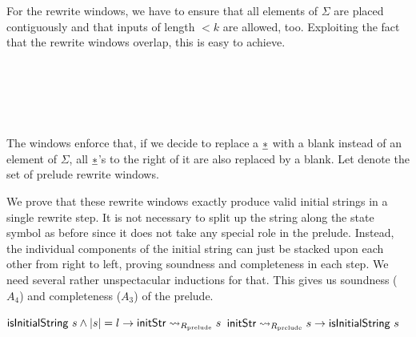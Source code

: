 For the rewrite windows, we have to ensure that all elements of $\Sigma$ are placed contiguously and that inputs of length $< k$ are allowed, too. Exploiting the fact that the rewrite windows overlap, this is easy to achieve.
\begin{center}
  \trewwin{\nblank}{\nblank}{\nblank}{\polneut\blank}{\polneut\blank}{\polneut\blank}
  \quad \trewwin{\ndelim}{\nblank}{\nblank}{\#}{\polneut\blank}{\polneut\blank}
  \quad \trewwin{\nblank}{\nblank}{\ndelim}{\polneut\blank}{\polneut\blank}{\#}\\
  \quad {}
  \quad {}\\
  \quad {}
  \quad {}
  \quad {}\\
  \quad{}
  \quad\trewwin{\nstar}{\nstar}{\nstar}{\polneut\blank}{\polneut\blank}{\polneut\blank}\\
  \hspace{0.10mm}
  \quad\trewwin{\nstar}{\nstar}{\nblank}{\polneut{\blank}}{\polneut{\blank}}{\polneut{\blank}}
  \quad{}
\end{center}
The windows enforce that, if we decide to replace a $\underline{*}$ with a blank instead of an element of $\Sigma$, all $\underline{*}$'s to the right of it are also replaced by a blank.
Let \mnotec[prelueRules]{$\Rprelude$} denote the set of prelude rewrite windows.

We prove that these rewrite windows exactly produce valid initial strings in a single rewrite step.
It is not necessary to split up the string along the state symbol as before since it does not take any special role in the prelude. Instead, the individual components of the initial string can just be stacked upon each other from right to left, proving soundness and completeness in each step. We need several rather unspectacular inductions for that.
This gives us soundness ($A_4$) and completeness ($A_3$) of the prelude.
\begin{lemma}\label{lem:prelude_sound_complete}\leavevmode
  \begin{enumerate}
     $\textsf{isInitialString}~s \land |s| = l \rightarrow \textsf{initStr} \rightsquigarrow_{R_{\text{prelude}}} s$
     $\textsf{initStr} \rightsquigarrow_{R_{\text{prelude}}} s \rightarrow \textsf{isInitialString}~s$
  \end{enumerate}
\end{lemma}


